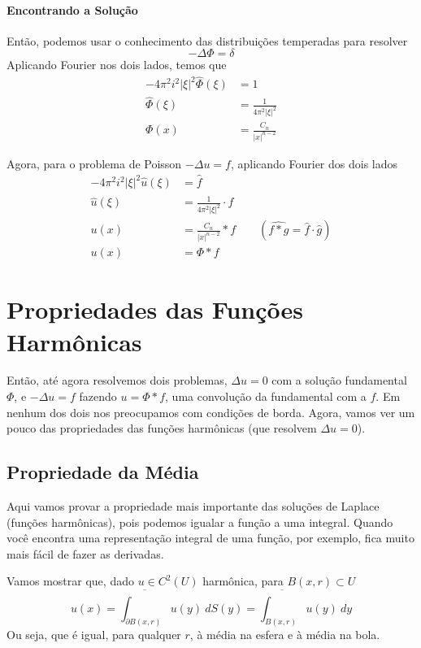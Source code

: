 \documentclass[11pt]{article}
\newcommand{\p}{\partial}
\begin{document}
\paragraph{Encontrando a Solução}
Então, podemos usar o conhecimento das distribuições temperadas para resolver 
\[ -\Delta \Phi = \delta \]
Aplicando Fourier nos dois lados, temos que \begin{align*}
	- 4\pi^2 i^2 |\xi|^2 \hat{\Phi}(\xi) &= 1 \\
	\hat{\Phi}(\xi) &= \frac{1}{4\pi^2|\xi|^2} \\
	\Phi(x) &= \frac{C_n}{|x|^{n-2}}
\end{align*}

Agora, para o problema de Poisson \(-\Delta u = f\), aplicando Fourier dos dois lados\begin{align*}
	- 4\pi^2 i^2 |\xi|^2 \hat{u}(\xi) &= \hat{f} \\
	\hat{u}(\xi) &= \frac{1}{4\pi^2|\xi|^2} \cdot \hat{f} \\
	u(x) &= \frac{C_n}{|x|^{n-2}} * f \qquad (\widehat{f*g} = \hat{f}\cdot \hat{g})\\
	u(x) &= \Phi * f 
\end{align*}

\section{Propriedades das Funções Harmônicas}

Então, até agora resolvemos dois problemas, \(\Delta u =0\) com a solução fundamental \(\Phi\), e \(-\Delta u = f\) fazendo \(u = \Phi * f\), uma convolução da fundamental com a \(f\). Em nenhum dos dois nos preocupamos com condições de borda. Agora, vamos ver um pouco das propriedades das funções harmônicas (que resolvem \(\Delta u=0\)).

\subsection{Propriedade da Média}

Aqui vamos provar a propriedade mais importante das soluções de Laplace (funções harmônicas), pois podemos igualar a função a uma integral. Quando você encontra uma representação integral de uma função, por exemplo, fica muito mais fácil de fazer as derivadas.

Vamos mostrar que, dado \( u \in C^2(U) \) harmônica, para \( B(x,r)\subset U \)\[ u(x) = \overline{\int_{\p B(x,r)}} u(y)\ dS(y) = \overline{\int_{B(x,r)}} u(y)\ dy  \] Ou seja, que é igual, para qualquer $r$, à média na esfera e à média na bola.
\end{document}
